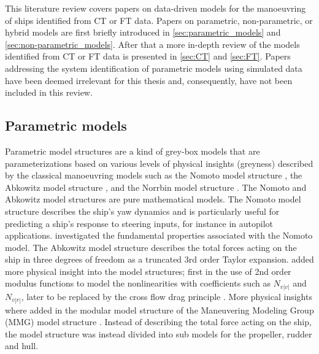 This literature review covers papers on data-driven models for the manoeuvring of ships identified from CT or FT data. Papers on parametric, non-parametric, or hybrid models are first briefly introduced in \autoref{sec:parametric_models} and \ref{sec:non-parametric_models}. After that a more in-depth review of the models identified from CT or FT data is presented in \autoref{sec:CT} and \ref{sec:FT}.
Papers addressing the system identification of parametric models using simulated data have been deemed irrelevant for this thesis and, consequently, have not been included in this review.

\subsection{Parametric models} \label{sec:parametric_models}
Parametric model structures are a kind of grey-box models that are parameterizations based on various levels of physical insights (greyness) described by the classical manoeuvring models such as the Nomoto model structure \cite{nomotoSteeringQualitiesShips1957}, the Abkowitz model structure \cite{abkowitzShipHydrodynamicsSteering1964}, and the Norrbin model structure \cite{norrbinTheoryObservationsUse1971}. The Nomoto and Abkowitz model structures are pure mathematical models. The Nomoto model structure describes the ship's yaw dynamics and is particularly useful for predicting a ship's response to steering inputs, for instance in autopilot applications. \textcite{tzengFUNDAMENTALPROPERTIESLINEAR1999} investigated the fundamental properties associated with the Nomoto model. The Abkowitz model structure describes the total forces acting on the ship in three degrees of freedom as a truncated 3rd order Taylor expansion. \textcite{norrbinTheoryObservationsUse1971} added more physical insight into the model structures; first in the use of 2nd order modulus functions  to model the nonlinearities with coefficients such as $N_{v|v|}$ and $N_{v|r|}$, later to be replaced by the cross flow drag principle \cite{fossenHandbookMarineCraft2011}. More physical insights where added in the modular model structure of the Maneuvering Modeling Group (MMG) model structure \cite{ogawaMathematicalModelManoeuvring1978,inouePracticalCalculationMethod1981,yasukawaIntroductionMMGStandard2015}. Instead of describing the total force acting on the ship, the model structure was instead divided into sub models for the propeller, rudder and hull.

